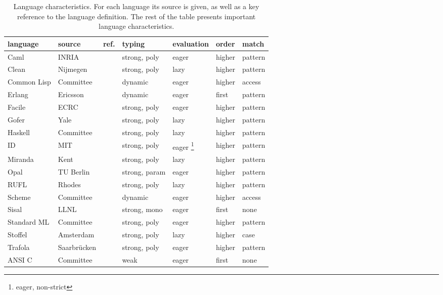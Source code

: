 \begin{table}
\begin{minipage}{\hsize}
\begin{center}
\begin{tabular}{|l|l|l|l|l|l|l|}
\hline
language     & source    & ref.        &    typing     &evaluation & order&match \\
\hline
Caml         & INRIA     &\cite{Wei93} & strong, poly  &  eager    &higher&pattern \\
Clean        & Nijmegen  &\cite{Pla94} & strong, poly  &   lazy    &higher&pattern \\
Common Lisp  & Committee &\cite{Ste90} & dynamic       &  eager    &higher& access \\
Erlang       & Ericsson  &\cite{Arm93} & dynamic       &  eager    & first&pattern \\
Facile       & ECRC      &\cite{Tho93a}& strong, poly  &  eager    &higher&pattern \\
Gofer        & Yale      &\cite{Jon94c}& strong, poly  &   lazy    &higher&pattern \\
Haskell      & Committee &\cite{Hud92a}& strong, poly  &   lazy    &higher&pattern \\
ID           & MIT       &\cite{Nik90a}& strong, poly  &   eager \footnote{eager, non-strict}
                                                                   &higher&pattern \\
Miranda      & Kent      &\cite{Tur85} & strong, poly  &   lazy    &higher&pattern \\
Opal         & TU Berlin &\cite{Did94} & strong, param &  eager    &higher&pattern \\
RUFL         & Rhodes    &\cite{Wen92} & strong, poly  &   lazy    &higher&pattern \\
Scheme       & Committee &\cite{Ree91} & dynamic       &  eager    &higher& access \\
Sisal        & LLNL      &\cite{McG85} & strong, mono  &  eager    &first &   none \\
Standard ML  & Committee &\cite{Mil90} & strong, poly  &  eager    &higher&pattern \\
Stoffel      & Amsterdam &\cite{Bee92a}& strong, poly  &   lazy    &higher&   case \\
Trafola & Saarbr\"ucken  &\cite{Alt93} & strong, poly  &  eager    &higher&pattern \\
\hline
ANSI C       & Committee &\cite{Ker88} &   weak        &  eager    & first&   none \\
\hline
\end{tabular}
\end{center}
\end{minipage}
\caption{Language characteristics. For each language its source is given, as
well as a key reference to the language definition. The rest of the
table presents important language characteristics.}
\label{tbl:language}
\end{table}


